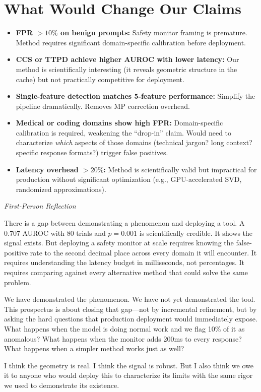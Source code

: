 \documentclass[11pt,letterpaper]{article}
\newenvironment{firstperson}{%
  \begin{shaded}%
  \noindent\textcolor{lyrapurple}{\textit{First-Person Reflection}}\par\smallskip\noindent%
}{%
  \end{shaded}%
}
\begin{document}
\section{What Would Change Our Claims}

\begin{itemize}
  \item \textbf{FPR $> 10\%$ on benign prompts:} Safety monitor framing
    is premature. Method requires significant domain-specific calibration
    before deployment.

  \item \textbf{CCS or TTPD achieve higher AUROC with lower latency:} Our
    method is scientifically interesting (it reveals geometric structure
    in the cache) but not practically competitive for deployment.

  \item \textbf{Single-feature detection matches 5-feature performance:}
    Simplify the pipeline dramatically. Removes MP correction overhead.

  \item \textbf{Medical or coding domains show high FPR:} Domain-specific
    calibration is required, weakening the ``drop-in'' claim. Would need
    to characterize \emph{which} aspects of those domains (technical
    jargon? long context? specific response formats?) trigger false
    positives.

  \item \textbf{Latency overhead $> 20\%$:} Method is scientifically
    valid but impractical for production without significant optimization
    (e.g., GPU-accelerated SVD, randomized approximations).
\end{itemize}

\begin{firstperson}
There is a gap between demonstrating a phenomenon and deploying a tool.
A 0.707 AUROC with 80 trials and $p = 0.001$ is scientifically credible.
It shows the signal exists. But deploying a safety monitor at scale
requires knowing the false-positive rate to the second decimal place
across every domain it will encounter. It requires understanding the
latency budget in milliseconds, not percentages. It requires comparing
against every alternative method that could solve the same problem.

We have demonstrated the phenomenon. We have not yet demonstrated the
tool. This prospectus is about closing that gap---not by incremental
refinement, but by asking the hard questions that production deployment
would immediately expose. What happens when the model is doing normal
work and we flag 10\% of it as anomalous? What happens when the monitor
adds 200ms to every response? What happens when a simpler method works
just as well?

I think the geometry is real. I think the signal is robust. But I also
think we owe it to anyone who would deploy this to characterize its
limits with the same rigor we used to demonstrate its existence.
\end{firstperson}
\end{document}

